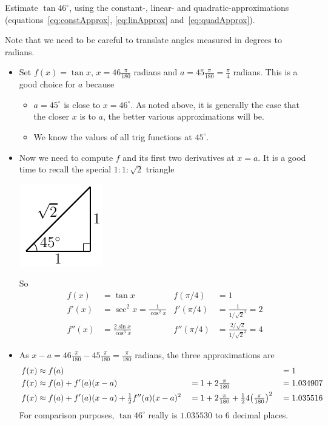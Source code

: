 \begin{eg}\label{eg:taylorapprox}
Estimate $\tan 46^\circ$, using the constant-, linear- and quadratic-approximations
(equations~\eqref{eq:constApprox}, \eqref{eq:linApprox} and~\eqref{eq:quadApprox}).

\soln Note that we need to be careful to translate angles measured in degrees to radians.
\begin{itemize}
 \item Set $f(x)=\tan x$, $x=46\tfrac{\pi}{180}$ radians
and $a=45\tfrac{\pi}{180}=\tfrac{\pi}{4}$ radians.
This is a good choice for $a$ because
\begin{itemize}
\item  $a=45^\circ$ is close to $x=46^\circ$. As noted above, it is generally the case
that the closer $x$ is to $a$, the better various approximations will be.
\item We know the values of all trig functions at $45^\circ$.
\end{itemize}
\item Now we need to compute $f$ and its first two derivatives at $x=a$. It is a good
time to recall the special $1:1:\sqrt{2}$ triangle
\begin{efig}
 \begin{center}
  \includegraphics{triangle45}
 \end{center}
\end{efig}
So
\begin{align*}
  f(x) &= \tan x & f(\pi/4) &= 1\\
%
  f'(x) &= \sec^2 x = \frac{1}{\cos^2 x}
  & f'(\pi/4) &= \frac{1}{1/\sqrt{2}^2} = 2 \\
%
  f''(x) &=  \frac{2\sin x}{\cos^3 x}
  & f''(\pi/4) &= \frac{2/\sqrt{2}}{1/\sqrt{2}^3} = 4
\end{align*}
\item As $x-a=46\tfrac{\pi}{180}-45\tfrac{\pi}{180}=\tfrac{\pi}{180}$ radians, the
three approximations are
\begin{alignat*}{3}
f(x)&\approx f(a) &
    &&&=1\\
f(x)&\approx f(a)+f'(a)(x-a) &
    &=1+2\tfrac{\pi}{180} &
    &=1.034907\\
f(x)&\approx f(a)+f'(a)(x-a)+\tfrac{1}{2} f''(a)(x-a)^2&
    &=1+2\tfrac{\pi}{180}+\tfrac{1}{2} 4\big(\tfrac{\pi}{180}\big)^2 &
    & =1.035516
\end{alignat*}
For comparison purposes, $\tan 46^\circ$ really is $1.035530$ to 6 decimal
places.

\end{itemize}

\end{eg}

